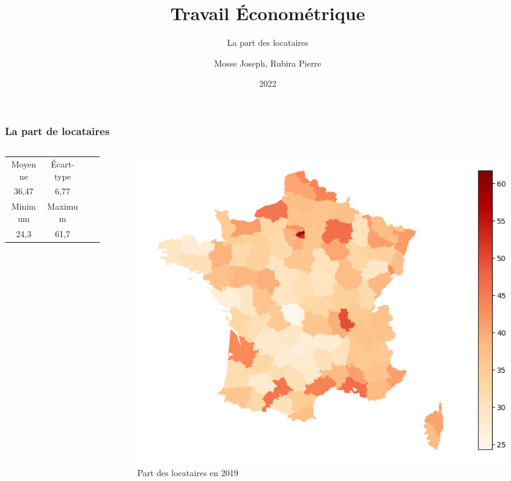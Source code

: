 \documentclass{beamer}
\title{Travail Économétrique}
\subtitle{La part des locataires}
\author{Mosse Joseph, Rubira Pierre}
\institute{Univeristé de Montpellier \\Faculté d'économie}
\date{2022}
\begin{document}
\frame{\titlepage}

\begin{frame}
\frametitle{La part de locataires}
\begin{columns}
    
\begin{column}{0.5\textwidth}
\begin{table}[H]
    \begin{tabular}{cccc}
    \toprule
    Moyenne  & Écart-type   \\ 
    36,47 & 6,77    \\
    \midrule
    Minimum & Maximum   \\ 
    24,3    & 61,7     \\
    \bottomrule
    \end{tabular}
\end{table}
\end{column}
\begin{column}{0.5\textwidth}
    \centering
    \begin{figure}
        \includegraphics[width=\textwidth]{locataire.png}
        \caption{Part des locataires en 2019}
    \end{figure}
\end{column}
\end{columns}
\end{frame}
\end{document}
